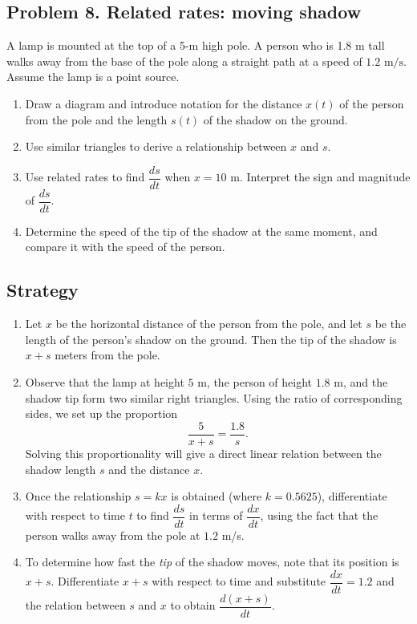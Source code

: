 \subsection{Problem 8. Related rates: moving shadow}
A lamp is mounted at the top of a 5-m high pole. A person who is 1.8 m tall walks away from the base of the pole along a straight path at a speed of $1.2\text{ m/s}$. Assume the lamp is a point source.

\begin{enumerate}[label=(\alph*)]
    \item Draw a diagram and introduce notation for the distance $x(t)$ of the person from the pole and the length $s(t)$ of the shadow on the ground.
    \item Use similar triangles to derive a relationship between $x$ and $s$.
    \item Use related rates to find $\dfrac{ds}{dt}$ when $x=10\text{ m}$. Interpret the sign and magnitude of $\dfrac{ds}{dt}$.
    \item Determine the speed of the tip of the shadow at the same moment, and compare it with the speed of the person.
\end{enumerate}

\subsection*{Strategy}
\begin{enumerate}[label=(\alph*)]

    \item
    Let $x$ be the horizontal distance of the person from the pole, and let 
    $s$ be the length of the person’s shadow on the ground.  
    Then the tip of the shadow is $x+s$ meters from the pole.

    \item
    Observe that the lamp at height $5$ m, the person of height $1.8$ m, and the
    shadow tip form two similar right triangles.  
    Using the ratio of corresponding sides, we set up the proportion
    \[
        \frac{5}{x+s} = \frac{1.8}{s}.
    \]
    Solving this proportionality will give a direct linear relation between 
    the shadow length $s$ and the distance $x$.

    \item
    Once the relationship $s = kx$ is obtained (where $k=0.5625$), 
    differentiate with respect to time $t$ to find 
    $\dfrac{ds}{dt}$ in terms of $\dfrac{dx}{dt}$, using the fact that the 
    person walks away from the pole at $1.2$ m/s.

    \item
    To determine how fast the \emph{tip} of the shadow moves, 
    note that its position is $x+s$.  
    Differentiate $x+s$ with respect to time and substitute 
    $\dfrac{dx}{dt}=1.2$ and the relation between $s$ and $x$ 
    to obtain $\dfrac{d(x+s)}{dt}$.
\end{enumerate}

